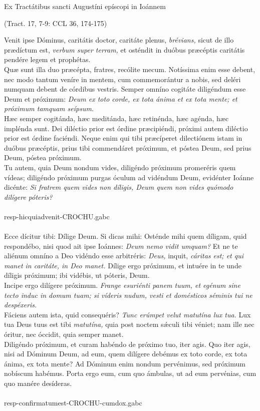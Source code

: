 \documentclass[options]{article}
\begin{document}
	Ex Tractátibus sancti Augustíni epíscopi in Ioánnem 
	\begin{flushright}
			(Tract. 17, 7-9: CCL 36, 174-175)
	\end{flushright}	
	Venit ipse Dóminus, caritátis doctor, caritáte plenus, \emph{brévians,} sicut de illo prædíctum est, \emph{verbum super terram,} et osténdit in duóbus præcéptis caritátis pendére legem et prophétas.\\
	Quæ sunt illa duo præcépta, fratres, recólite mecum. Notíssima enim esse debent, nec modo tantum veníre in mentem, cum commemorántur a nobis, sed deléri numquam debent de córdibus vestris. Semper omníno cogitáte diligéndum esse Deum et próximum: \emph{Deum ex toto corde, ex tota ánima et ex tota mente; et próximum tamquam seípsum.}\\
	Hæc semper cogitánda, hæc meditánda, hæc retinénda, hæc agénda, hæc implénda sunt. Dei diléctio prior est órdine præcipiéndi, próximi autem diléctio prior est órdine faciéndi. Neque enim qui tibi præcíperet dilectiónem istam in duóbus præcéptis, prius tibi commendáret próximum, et póstea Deum, sed prius Deum, póstea próximum.\\
	Tu autem, quia Deum nondum vides, diligéndo próximum promeréris quem vídeas; diligéndo próximum purgas óculum ad vidéndum Deum, evidénter Ioánne dicénte: \emph{Si fratrem quem vides non díligis, Deum quem non vides quómodo dilígere póteris?}\\
	\\
	resp-hicquiadvenit-CROCHU.gabc
	\\\\
	Ecce dícitur tibi: Dílige Deum. Si dicas mihi: Osténde mihi quem díligam, quid respondébo, nisi quod ait ipse Ioánnes: \emph{Deum nemo vidit umquam?} Et ne te aliénum omníno a Deo vidéndo esse arbitréris: \emph{Deus,} inquit, \emph{cáritas est; et qui manet in caritáte, in Deo manet.} Dílige ergo próximum, et intuére in te unde díligis próximum; ibi vidébis, ut póteris, Deum.\\
	Incipe ergo dilígere próximum. \emph{Frange esuriénti panem tuum, et egénum sine tecto induc in domum tuam; si víderis nudum, vesti et domésticos séminis tui ne despéxeris.}\\
	Fáciens autem ista, quid consequéris? \emph{Tunc erúmpet velut matutína lux tua.} Lux tua Deus tuus est tibi \emph{matutína,} quia post noctem s\'{æ}culi tibi véniet; nam ille nec óritur, nec óccidit, quia semper manet.\\
	Diligéndo próximum, et curam habéndo de próximo tuo, iter agis. Quo iter agis, nisi ad Dóminum Deum, ad eum, quem dilígere debémus ex toto corde, ex tota ánima, ex tota mente? Ad Dóminum enim nondum pervénimus, sed próximum nobíscum habémus. Porta ergo eum, cum quo ámbulas, ut ad eum pervénias, cum quo manére desíderas.\\
	\\
resp-confirmatumest-CROCHU-cumdox.gabc
\end{document}

